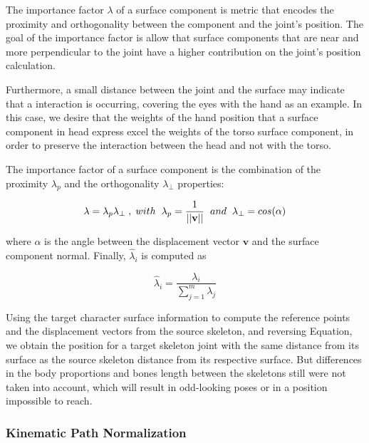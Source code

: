 \documentclass{vgtc}
\begin{document}
The importance factor \(\lambda\) of a surface component is metric that
encodes the proximity and orthogonality between the component and the
joint's position. The goal of the importance factor is allow that
surface components that are near and more perpendicular to the joint
have a higher contribution on the joint's position calculation.

Furthermore, a small distance between the joint and the surface may
indicate that a interaction is occurring, covering the eyes with the
hand as an example. In this case, we desire that the weights of the hand
position that a surface component in head express excel the weights of
the torso surface component, in order to preserve the interaction
between the head and not with the torso.

The importance factor of a surface component is the combination of the
proximity \(\lambda_p\) and the orthogonality \(\lambda_{\perp}\)
properties:

\begin{equation}
\label{eq:importance}
\lambda = \lambda_p \lambda_{\perp}\hspace{0.1cm},\hspace{0.1cm} with \hspace{0.2cm}\lambda_p =  \frac{1}{||\mathbf{v}||}\hspace{0.2cm} and \hspace{0.2cm}\lambda_{\perp} = cos(\alpha)
\end{equation}

where \(\alpha\) is the angle between the displacement vector
\(\mathbf{v}\) and the surface component normal. Finally,
\(\hat{\lambda}_{i}\) is computed as

\begin{equation}
\label{eq:importance_ortho}
\hat{\lambda}_{i} = \frac{\lambda_{i}}{\sum_{j=1}^{m}\lambda_{j}}
\end{equation}

Using the target character surface information to compute the reference
points and the displacement vectors from the source skeleton, and
reversing Equation, we obtain the position for a target skeleton joint
with the same distance from its surface as the source skeleton distance
from its respective surface. But differences in the body proportions and
bones length between the skeletons still were not taken into account,
which will result in odd-looking poses or in a position impossible to
reach.


    \subsubsection{Kinematic Path
Normalization}\label{kinematic-path-normalization}
\end{document}
